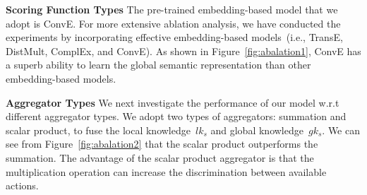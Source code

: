 
\noindent
\textbf{Scoring Function Types}
The pre-trained embedding-based model that we adopt is ConvE. For more extensive ablation analysis, we have conducted the experiments by incorporating effective embedding-based models~(i.e., TransE, DistMult, ComplEx, and ConvE).
As shown in Figure~\ref{fig:abalation1}, 
ConvE has a superb ability to learn the global semantic representation than other embedding-based models.

\noindent
\textbf{Aggregator Types}
We next investigate the performance of our model
w.r.t different aggregator types. We adopt two types of aggregators: summation and scalar product, to fuse the local knowledge~$lk_{s}$ and global knowledge~$gk_{s}$.
We can see from Figure~\ref{fig:abalation2} that the scalar product outperforms the summation. The advantage of the scalar product aggregator is that the multiplication operation can increase the discrimination between available actions.


